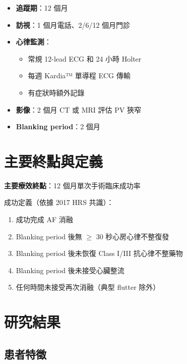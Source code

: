 \documentclass[12pt,a4paper]{article}
\begin{document}
\begin{itemize}
    \item \textbf{追蹤期}：12 個月
    \item \textbf{訪視}：1 個月電話、2/6/12 個月門診
    \item \textbf{心律監測}：
    \begin{itemize}
        \item 常規 12-lead ECG 和 24 小時 Holter
        \item 每週 Kardia™ 單導程 ECG 傳輸
        \item 有症狀時額外記錄
    \end{itemize}
    \item \textbf{影像}：2 個月 CT 或 MRI 評估 PV 狹窄
    \item \textbf{Blanking period}：2 個月
\end{itemize}

\section{主要終點與定義}

\textbf{主要療效終點}：12 個月單次手術臨床成功率

成功定義（依據 2017 HRS 共識）：
\begin{enumerate}
    \item 成功完成 AF 消融
    \item Blanking period 後無 $\geq$ 30 秒心房心律不整復發
    \item Blanking period 後未恢復 Class I/III 抗心律不整藥物
    \item Blanking period 後未接受心臟整流
    \item 任何時間未接受再次消融（典型 flutter 除外）
\end{enumerate}

\section{研究結果}

\subsection{患者特徵}
\end{document}

